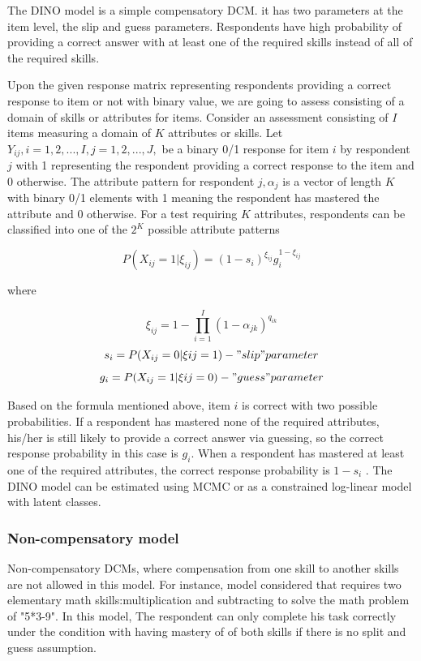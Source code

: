 \documentclass[12pt]{article}
\begin{document}
The DINO model is a simple compensatory DCM. it has two parameters at the item level, the slip and guess parameters. Respondents have high probability of providing a correct answer with at least one of the
required skills instead of all of the required skills.

Upon the given response matrix representing respondents providing a correct response to item or not with binary value, we are going to assess consisting of a domain of skills or attributes for items. Consider an assessment consisting of $I$ items measuring a domain of $K$ attributes
or skills. Let $Y_{ij} , i=1,2,..., I, j=1,2,...,J,$ be a binary 0/1 response for item $i$ by respondent
$j$ with 1 representing the respondent providing a correct response to the item and 0
otherwise. The attribute pattern for respondent $j, \alpha_j$ is a vector of length $K$ with binary 0/1
elements with 1 meaning the respondent has mastered the attribute and 0 otherwise. For
a test requiring $K$ attributes, respondents can be classified into one of the $2^K$ possible
attribute patterns

$$P (X_{ij}=1|\xi_{ij})=(1-s_i)^{\xi_{ij}}g_i^{1-\xi_{ij}}$$  

where 

$$\xi_{ij}=1 - \prod\limits_{i=1}^I (1-\alpha_{jk})^{q_{ik}}$$
$$ s_i= P(X_{ij}=0|\xi{ij}=1)-"slip" parameter $$
$$ g_i= P(X_{ij}=1|\xi{ij}=0)-"guess" parameter $$
  
Based on the formula mentioned above, item $i$ is correct with two possible probabilities. If a respondent has mastered none of the required attributes, his/her is still
likely to provide a correct answer via guessing, so the correct response probability in this
case is $g_i$. When a respondent has mastered at least one of the required attributes, the
correct response probability is $1−s_i$ . The DINO model can be estimated using
MCMC\cite{templin2006measurement} or as a constrained log-linear model with latent
classes.

\subsubsection{Non-compensatory model}
 Non-compensatory DCMs, where compensation from one skill to another skills are not allowed in this model. For instance, model considered that requires two elementary math skills:multiplication and subtracting to solve the math problem of "5*3-9". In this model, The respondent can only complete his task correctly under the condition with having mastery of of both skills if there is no split and guess assumption. 
 
\end{document}
